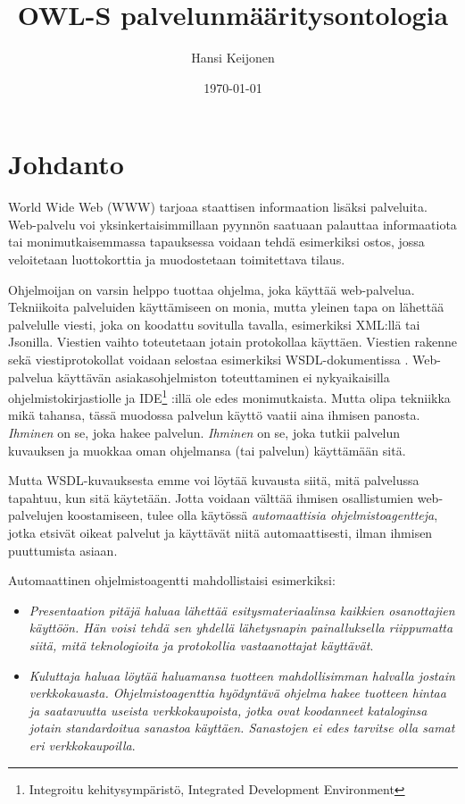 \documentclass[finnish]{tktltiki2}
\title{OWL-S palvelunmääritysontologia}
\author{Hansi Keijonen}
\date{\today}
\theoremstyle{definition}
\theoremstyle{remark}
\begin{document}

\maketitle        %
\makeabstract     %

\tableofcontents  %
\newpage          %



\section{Johdanto}

World Wide Web (WWW) tarjoaa staattisen informaation lisäksi palveluita. Web-palvelu voi yksinkertaisimmillaan pyynnön saatuaan palauttaa informaatiota tai monimutkaisemmassa tapauksessa voidaan tehdä  esimerkiksi ostos, jossa veloitetaan luottokorttia ja muodostetaan toimitettava tilaus\cite{with_owls}. 

Ohjelmoijan on varsin helppo tuottaa ohjelma, joka käyttää web-palvelua. Tekniikoita palveluiden käyttämiseen on monia, mutta yleinen tapa on lähettää palvelulle viesti, joka on koodattu sovitulla tavalla, esimerkiksi XML:llä tai Jsonilla. Viestien vaihto toteutetaan jotain protokollaa käyttäen. Viestien rakenne sekä viestiprotokollat voidaan  selostaa esimerkiksi WSDL-dokumentissa \cite{WSDL}. Web-palvelua käyttävän asiakasohjelmiston toteuttaminen ei nykyaikaisilla ohjelmistokirjastiolle ja IDE\footnote{Integroitu kehitysympäristö, Integrated Development Environment} :illä ole edes monimutkaista. Mutta olipa tekniikka mikä tahansa, tässä muodossa palvelun käyttö vaatii aina ihmisen panosta. \textit{Ihminen} on se, joka hakee palvelun. \textit{Ihminen} on se, joka tutkii palvelun kuvauksen ja muokkaa oman ohjelmansa (tai palvelun) käyttämään sitä. 

Mutta WSDL-kuvauksesta emme voi löytää kuvausta siitä, mitä palvelussa tapahtuu, kun sitä käytetään\cite{with_owls}. Jotta voidaan välttää ihmisen osallistumien web-palvelujen koostamiseen, tulee olla käytössä \textit{automaattisia ohjelmistoagentteja}, jotka etsivät oikeat palvelut ja käyttävät niitä automaattisesti, ilman ihmisen puuttumista asiaan\cite{with_owls}.

Automaattinen ohjelmistoagentti mahdollistaisi esimerkiksi:

\begin{itemize}
\item \textit{Presentaation pitäjä haluaa lähettää esitysmateriaalinsa kaikkien osanottajien käyttöön. Hän voisi tehdä sen yhdellä lähetysnapin painalluksella riippumatta siitä, mitä teknologioita ja protokollia vastaanottajat käyttävät}\cite{with_owls}.

\item \textit{Kuluttaja haluaa löytää haluamansa tuotteen mahdollisimman halvalla jostain verkkokauasta. Ohjelmistoagenttia hyödyntävä ohjelma hakee tuotteen hintaa ja saatavuutta useista verkkokaupoista, jotka ovat koodanneet kataloginsa jotain standardoitua sanastoa käyttäen. Sanastojen ei edes tarvitse olla samat eri verkkokaupoilla}\cite{with_owls}. 
\end{itemize}
\end{document}
